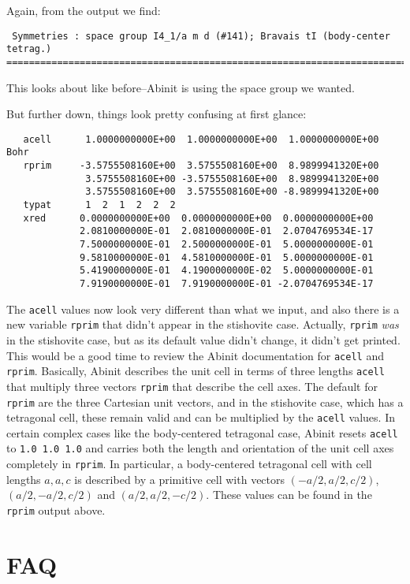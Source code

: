 \documentclass{article}
\begin{document}
Again, from the output we find:
\begin{verbatim}
 Symmetries : space group I4_1/a m d (#141); Bravais tI (body-center tetrag.)
================================================================================
\end{verbatim}
This looks about like before--{\sc Abinit} is using the space group we wanted.

But further down, things look pretty confusing at first glance:
\begin{verbatim}
   acell      1.0000000000E+00  1.0000000000E+00  1.0000000000E+00 Bohr
   rprim     -3.5755508160E+00  3.5755508160E+00  8.9899941320E+00
              3.5755508160E+00 -3.5755508160E+00  8.9899941320E+00
              3.5755508160E+00  3.5755508160E+00 -8.9899941320E+00
   typat      1  2  1  2  2  2
   xred      0.0000000000E+00  0.0000000000E+00  0.0000000000E+00
             2.0810000000E-01  2.0810000000E-01  2.0704769534E-17
             7.5000000000E-01  2.5000000000E-01  5.0000000000E-01
             9.5810000000E-01  4.5810000000E-01  5.0000000000E-01
             5.4190000000E-01  4.1900000000E-02  5.0000000000E-01
             7.9190000000E-01  7.9190000000E-01 -2.0704769534E-17
\end{verbatim}
The {\tt acell} values now look very different than what we input, and also there is a new
variable {\tt rprim} that didn't appear in the stishovite case. Actually, {\tt rprim} {\em was}
in the stishovite case, but as its default value didn't change, it didn't get printed. This would
be a good time to review the {\sc Abinit} documentation for {\tt acell} and {\tt rprim}. Basically,
{\sc Abinit} describes the unit cell in terms of three lengths {\tt acell} that multiply three
vectors {\tt rprim} that describe the cell axes. The default for {\tt rprim} are the three
Cartesian unit vectors, and in the stishovite case, which has a tetragonal cell, these remain
valid and can be multiplied by the {\tt acell} values. In certain complex cases like the body-centered
tetragonal case, {\sc Abinit} resets {\tt acell} to {\tt 1.0 1.0 1.0} and carries both the
length and orientation of the unit cell axes completely in {\tt rprim}. In particular, a body-centered
tetragonal cell with cell lengths $a,a,c$ is described by a primitive cell with vectors
$(-a/2,a/2,c/2)$, $(a/2, -a/2, c/2)$ and $(a/2,a/2,-c/2)$. These values can be found in the
{\tt rprim} output above.

\section{FAQ}
\end{document}

